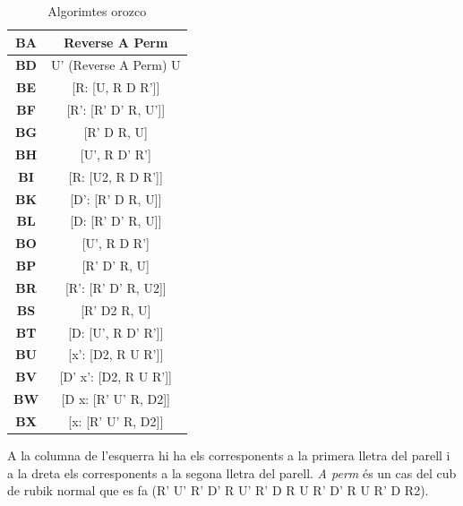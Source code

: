 \begin{table}[h]
    \begin{minipage}{.5\linewidth}
        \centering
        \begin{tabular}{|c|c|}
            \hline
            \textbf{BA} & Reverse A Perm \\
            \hline
            \textbf{BD} & U' (Reverse A Perm) U \\
            \hline
            \textbf{BE} & [R: [U, R D R']] \\
            \hline
            \textbf{BF} & [R': [R' D' R, U']] \\
            \hline
            \textbf{BG} & [R' D R, U] \\
            \hline
            \textbf{BH} & [U', R D' R'] \\
            \hline
            \textbf{BI} & [R: [U2, R D R']] \\
            \hline
            \textbf{BK} & [D': [R' D R, U]] \\
            \hline
            \textbf{BL} & [D: [R' D' R, U]] \\
            \hline
            \textbf{BO} & [U', R D R'] \\
            \hline
            \textbf{BP} & [R' D' R, U] \\
            \hline
            \textbf{BR} & [R': [R' D' R, U2]] \\
            \hline
            \textbf{BS} & [R' D2 R, U] \\
            \hline
            \textbf{BT} & [D: [U', R D' R']] \\
            \hline
            \textbf{BU} & [x': [D2, R U R']] \\
            \hline
            \textbf{BV} & [D' x': [D2, R U R']] \\
            \hline
            \textbf{BW} & [D x: [R' U' R, D2]] \\
            \hline
            \textbf{BX} & [x: [R' U' R, D2]] \\
            \hline 
        \end{tabular}
    \end{minipage} 
    \caption{Algorimtes orozco}
\end{table}

A la columna de l'esquerra hi ha els corresponents a la primera lletra del parell i a la dreta els corresponents a la segona lletra del parell. \textit{A perm} és un cas del cub de rubik normal que es fa (R' U' R' D' R U' R' D R U R' D' R U R' D R2).

